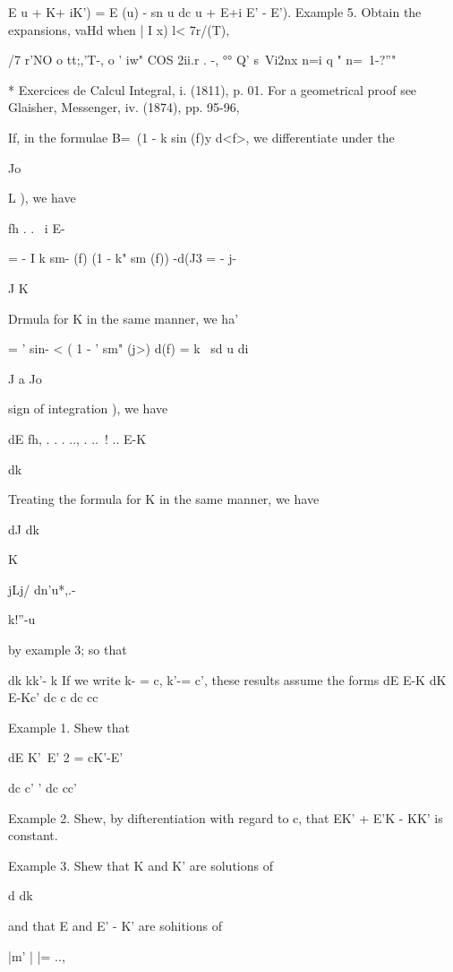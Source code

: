 E u + K+ iK') = E (u) - sn u dc u + E+i E' - E'). Example 5. Obtain
the expansions, vaHd when | I x) l< 7r/(T),

/7 r'NO o tt;,'T-, o ' iw" COS 2ii.r . -, °° Q' s\ Vi2nx n=i q " n=\
1-?''"


* Exercices de Calcul Integral, i. (1811), p. 01. For a geometrical
proof see Glaisher, Messenger, iv. (1874), pp. 95-96,

%
%


If, in the formulae B=\ (1 - k sin (f)y d<f>, we differentiate under
the

Jo

L ), we have

fh . . \ i E-

= - I k sm- (f) (1 - k" sm (f)) -d(J3 = - j-

J K

Drmula for K in the same manner, we ha'

= ' sin- < ( 1 -  ' sm" (j>) d(f) = k \ sd u di

J a Jo

sign of integration  ), we have

dE fh, . . . .., . ..\ ! .. E-K

dk

Treating the formula for K in the same manner, we have

dJ dk

K

jLj/ dn'u*,.-

k!''-u

by example 3; so that

dk kk'- k If we write k- = c, k'-= c', these results assume the forms
dE E-K dK E-Kc' dc c dc cc

Example 1. Shew that

 dE K'~E' 2 = cK'-E'

dc c' ' dc cc'

Example 2. Shew, by difterentiation with regard to c, that EK' + E'K -
KK' is constant.

Example 3. Shew that K and K' are solutions of

d dk

and that E and E' - K' are sohitions of

|m' | |= ..,

